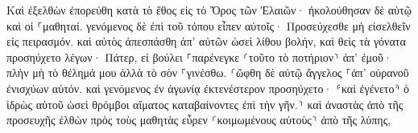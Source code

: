 \documentclass{openreader}
\begin{document}
Καὶ ἐξελθὼν ἐπορεύθη κατὰ τὸ ἔθος εἰς τὸ Ὄρος τῶν Ἐλαιῶν· ἠκολούθησαν δὲ αὐτῷ καὶ οἱ ⸀μαθηταί. 
γενόμενος δὲ ἐπὶ τοῦ τόπου εἶπεν αὐτοῖς· Προσεύχεσθε μὴ εἰσελθεῖν εἰς πειρασμόν. 
καὶ αὐτὸς ἀπεσπάσθη ἀπ’ αὐτῶν ὡσεὶ λίθου βολήν, καὶ θεὶς τὰ γόνατα προσηύχετο 
λέγων· Πάτερ, εἰ βούλει ⸀παρένεγκε ⸂τοῦτο τὸ ποτήριον⸃ ἀπ’ ἐμοῦ· πλὴν μὴ τὸ θέλημά μου ἀλλὰ τὸ σὸν ⸀γινέσθω. 
⸂ὤφθη δὲ αὐτῷ ἄγγελος ⸀ἀπ’ οὐρανοῦ ἐνισχύων αὐτόν. 
καὶ γενόμενος ἐν ἀγωνίᾳ ἐκτενέστερον προσηύχετο· ⸄καὶ ἐγένετο⸅ ὁ ἱδρὼς αὐτοῦ ὡσεὶ θρόμβοι αἵματος καταβαίνοντες ἐπὶ τὴν γῆν.⸃ 
καὶ ἀναστὰς ἀπὸ τῆς προσευχῆς ἐλθὼν πρὸς τοὺς μαθητὰς εὗρεν ⸂κοιμωμένους αὐτοὺς⸃ ἀπὸ τῆς λύπης, 
\end{document}
